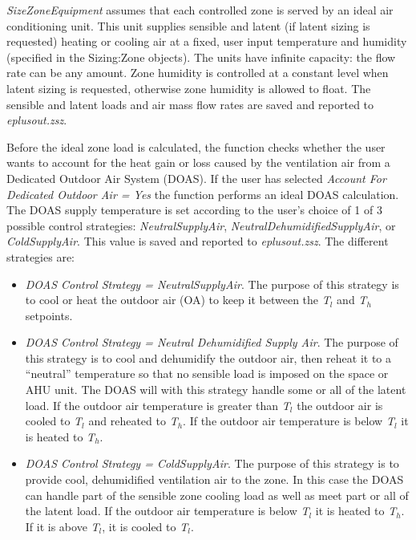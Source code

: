 \emph{SizeZoneEquipment} assumes that each controlled zone is served by an ideal air conditioning unit. This unit supplies sensible and latent (if latent sizing is requested) heating or cooling air at a fixed, user input temperature and humidity (specified in the Sizing:Zone objects). The units have infinite capacity: the flow rate can be any amount. Zone humidity is controlled at a constant level when latent sizing is requested, otherwise zone humidity is allowed to float. The sensible and latent loads and air mass flow rates are saved and reported to \emph{eplusout.zsz}.

Before the ideal zone load is calculated, the function checks whether the user wants to account for the heat gain or loss caused by the ventilation air from a Dedicated Outdoor Air System (DOAS). If the user has selected \emph{Account For Dedicated Outdoor Air = Yes} the function performs an ideal DOAS calculation. The DOAS supply temperature is set according to the user's choice of 1 of 3 possible control strategies: \emph{NeutralSupplyAir}, \emph{NeutralDehumidifiedSupplyAir}, or \emph{ColdSupplyAir}. This value is saved and reported to \emph{eplusout.zsz}. The different strategies are:

\begin{itemize}
\item
  \emph{DOAS Control Strategy = NeutralSupplyAir}. The purpose of this strategy is to cool or heat the outdoor air (OA) to keep it between the \emph{T\(_{l}\)} and \emph{T\(_{h}\)} setpoints.
\item
  \emph{DOAS Control Strategy = Neutral Dehumidified Supply Air}. The purpose of this strategy is to cool and dehumidify the outdoor air, then reheat it to a ``neutral'' temperature so that no sensible load is imposed on the space or AHU unit. The DOAS will with this strategy handle some or all of the latent load. If the outdoor air temperature is greater than \emph{T\(_{l}\)} the outdoor air is cooled to \emph{T\(_{l}\)} and reheated to \emph{T\(_{h}\)}. If the outdoor air temperature is below \emph{T\(_{l}\)} it is heated to \emph{T\(_{h}\)}.
\item
  \emph{DOAS Control Strategy = ColdSupplyAir}. The purpose of this strategy is to provide cool, dehumidified ventilation air to the zone. In this case the DOAS can handle part of the sensible zone cooling load as well as meet part or all of the latent load. If the outdoor air temperature is below \emph{T\(_{l}\)} it is heated to \emph{T\(_{h}\)}. If it is above \emph{T\(_{l}\)}, it is cooled to \emph{T\(_{l}\)}.
\end{itemize}

